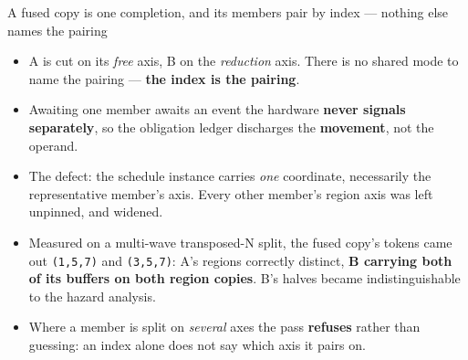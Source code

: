 \documentclass[aspectratio=169,9pt]{beamer}
\newcommand{\key}[1]{\textcolor{acc}{\textbf{#1}}}
\newcommand{\bad}[1]{\textcolor{warn}{\textbf{#1}}}
\newcommand{\good}[1]{\textcolor{ok}{\textbf{#1}}}
\begin{document}
\begin{frame}{A fused copy is one completion, and its members pair by index --- nothing else names the pairing}
\begin{center}
\end{center}
\begin{itemize}
\item A is cut on its \emph{free} axis, B on the \emph{reduction} axis. There is no shared mode to
      name the pairing --- \key{the index is the pairing}.
\item Awaiting one member awaits an event the hardware \bad{never signals separately}, so the
      obligation ledger discharges the \key{movement}, not the operand.
\item The defect: the schedule instance carries \emph{one} coordinate, necessarily the
      representative member's axis. Every other member's region axis was left unpinned, and widened.
\item Measured on a multi-wave transposed-N split, the fused copy's tokens came out
      \texttt{(1,5,7)} and \texttt{(3,5,7)}: A's regions correctly distinct, \bad{B carrying both of
      its buffers on both region copies}. B's halves became indistinguishable to the hazard analysis.
\item Where a member is split on \emph{several} axes the pass \good{refuses} rather than guessing:
      an index alone does not say which axis it pairs on.
\end{itemize}
\end{frame}
\end{document}
